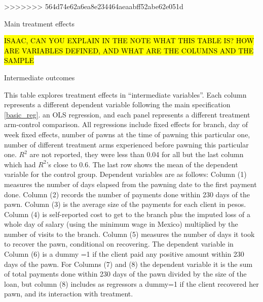 \documentclass[oneside,11pt]{article}
\begin{document}
{\newpage

>>>>>>> 564d74e62a6ea8e234464aeaabff52abe62e051d
\vspace{.2in}

\begin{table}[H]
\caption{Main treatment effects}
\label{main_impact_table}
\begin{center}
\scriptsize{}
\end{center}
\noindent \hl{ISAAC, CAN YOU EXPLAIN IN THE NOTE WHAT THIS TABLE IS? HOW ARE VARIABLES DEFINED, AND WHAT ARE THE COLUMNS AND THE SAMPLE }
\end{table}



\newpage
\begin{landscape}
\begin{table}[H]
\caption{Intermediate outcomes}
\label{mechanisms}
\begin{center}
\scriptsize{}
\end{center}

\end{table}

\scriptsize {
\noindent This table explores treatment effects in ``intermediate variables''. Each column represents a different dependent variable following the main specification \ref{basic_reg}.
an OLS regression, and each panel represents a different treatment arm-control comparison. All regressions include fixed effects for branch, day of week fixed effects, number of pawns at the time of pawning this particular one, number of different treatment arms experienced before pawning this particular one. $R^2$ are not reported, they were less than 0.04 for all but the last column which had $R^2$'s close to 0.6. The last row shows the mean of the dependent variable for the control group. Dependent variables are as follows: Column (1) measures the number of days elapsed from the pawning date to the first payment done. Column (2) records the number of payments done within 230 days of the pawn. Column (3) is the average size of the payments for each client in pesos. Column (4) is self-reported cost to get to the branch plus the imputed loss of a whole day of salary (using the minimum wage in Mexico) multiplied by the number of visits to the branch. Column (5) measures the number of days it took to recover the pawn, conditional on recovering. The dependent variable in Column (6) is a dummy =1 if the client paid any positive amount within 230 days of the pawn. For Columns (7) and (8) the dependent variable it is the sum of total payments done within 230 days of the pawn divided by the size of the loan, but column (8) includes as regressors a dummy=1 if the client recovered her pawn, and its interaction with treatment.
}


\end{landscape}}
\end{document}
